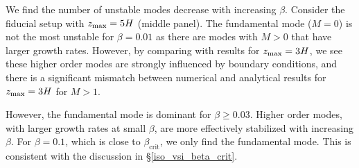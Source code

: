 We find the number of unstable modes decrease with increasing
$\beta$. Consider the fiducial setup with $z_\mathrm{max}=5H$ 
(middle panel). The fundamental mode ($M=0$) is not the most unstable for   
$\beta=0.01$ as there are modes with $M>0$ that have larger growth 
rates. However, by comparing with results for $z_\mathrm{max}=3H$, we see these
higher order modes are strongly influenced by boundary conditions, and
there is a significant mismatch between numerical and analytical
results for $z_\mathrm{max}=3H$ for $M>1$.   

However, the fundamental mode is dominant for $\beta \geq 
0.03$. Higher order modes, with larger growth rates at small $\beta$,
are more effectively stabilized with increasing $\beta$. For
$\beta=0.1$, which is close to $\beta_\mathrm{crit}$, we only find the
fundamental mode. This is consistent with the discussion in 
\S\ref{iso_vsi_beta_crit}.    

